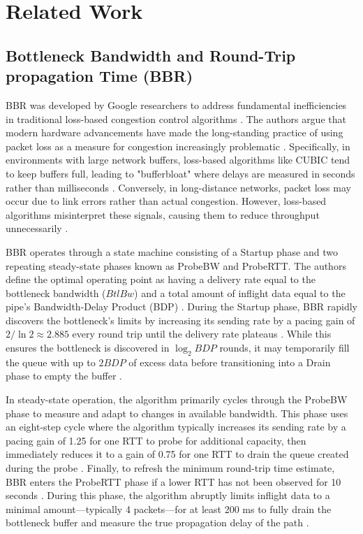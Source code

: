 
\section{Related Work}\label{sec:RelatedWork}

\subsection{Bottleneck Bandwidth and Round-Trip propagation Time (BBR)}

BBR was developed by Google researchers to address fundamental inefficiencies in traditional loss-based congestion control algorithms \cite{BBRORIGINAL}. 
The authors argue that modern hardware advancements have made the long-standing practice of using packet loss as a measure for congestion increasingly problematic \cite{BBRORIGINAL}. 
Specifically, in environments with large network buffers, loss-based algorithms like CUBIC tend to keep buffers full, leading to "bufferbloat" where delays are measured in seconds rather than milliseconds \cite{BBRORIGINAL}. 
Conversely, in long-distance networks, packet loss may occur due to link errors rather than actual congestion.
However, loss-based algorithms misinterpret these signals, causing them to reduce throughput unnecessarily \cite{BBRORIGINAL}.

BBR operates through a state machine consisting of a Startup phase and two repeating steady-state phases known as ProbeBW and ProbeRTT\cite{BBREVALUATION}. 
The authors define the optimal operating point as having a delivery rate equal to the bottleneck bandwidth ($BtlBw$) and a total amount of inflight data equal to the pipe's Bandwidth-Delay Product (BDP) \cite{BBRORIGINAL}. 
During the Startup phase, BBR rapidly discovers the bottleneck's limits by increasing its sending rate by a pacing gain of $2/\ln 2 \approx 2.885$ every round trip until the delivery rate plateaus \cite{BBRORIGINAL}.
While this ensures the bottleneck is discovered in $\log_2 BDP$ rounds, it may temporarily fill the queue with up to $2BDP$ of excess data before transitioning into a Drain phase to empty the buffer \cite{BBRORIGINAL, BBREVALUATION}.

In steady-state operation, the algorithm primarily cycles through the ProbeBW phase to measure and adapt to changes in available bandwidth. 
This phase uses an eight-step cycle where the algorithm typically increases its sending rate by a pacing gain of 1.25 for one RTT to probe for additional capacity, then immediately reduces it to a gain of 0.75 for one RTT to drain the queue created during the probe \cite{BBREVALUATION}. 
Finally, to refresh the minimum round-trip time estimate, BBR enters the ProbeRTT phase if a lower RTT has not been observed for 10 seconds \cite{BBREVALUATION}. 
During this phase, the algorithm abruptly limits inflight data to a minimal amount—typically 4 packets—for at least 200 ms to fully drain the bottleneck buffer and measure the true propagation delay of the path \cite{BBRORIGINAL, BBREVALUATION}.

